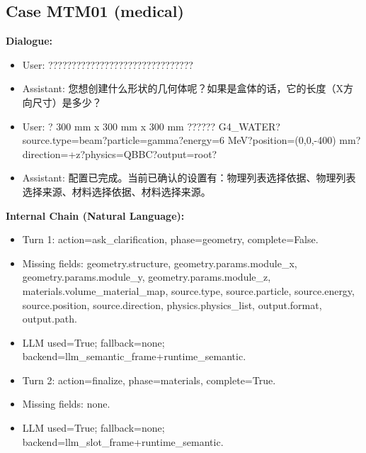\documentclass[11pt]{ctexart}
\begin{document}
\subsection{Case MTM01 (medical)}
\textbf{Dialogue:}
\begin{itemize}
\item User: ???????????????????????????????
\item Assistant: 您想创建什么形状的几何体呢？如果是盒体的话，它的长度（X方向尺寸）是多少？
\item User: ? 300 mm x 300 mm x 300 mm ?????? G4\_WATER?source.type=beam?particle=gamma?energy=6 MeV?position=(0,0,-400) mm?direction=+z?physics=QBBC?output=root?
\item Assistant: 配置已完成。当前已确认的设置有：物理列表选择依据、物理列表选择来源、材料选择依据、材料选择来源。
\end{itemize}
\textbf{Internal Chain (Natural Language):}
\begin{itemize}
\item Turn 1: action=ask\_clarification, phase=geometry, complete=False.
\item Missing fields: geometry.structure, geometry.params.module\_x, geometry.params.module\_y, geometry.params.module\_z, materials.volume\_material\_map, source.type, source.particle, source.energy, source.position, source.direction, physics.physics\_list, output.format, output.path.
\item LLM used=True; fallback=none; backend=llm\_semantic\_frame+runtime\_semantic.
\item Turn 2: action=finalize, phase=materials, complete=True.
\item Missing fields: none.
\item LLM used=True; fallback=none; backend=llm\_slot\_frame+runtime\_semantic.
\end{itemize}
\end{document}
